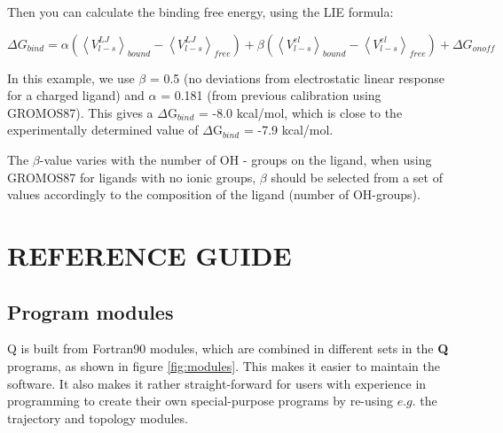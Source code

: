 \documentclass[a4paper,10pt]{article}
\begin{document}


Then you can calculate the binding free energy, using the LIE
formula:

\begin {equation}
\label{eq:LIE} \Delta G_{bind} = \alpha \left( {\left\langle
{V_{l-s}^{LJ}} \right\rangle_{bound} - \left\langle {V_{l-s}^{LJ}}
\right\rangle_{free}} \right) + \beta\left( {\left\langle
{V_{l-s}^{el}} \right\rangle_{bound} - \left\langle {V_{l-s}^{el}}
\right\rangle_{free}} \right) + \Delta G_{onoff}
\end{equation}

In this example, we use $\beta $ = 0.5 (no deviations from
electrostatic linear response for a charged ligand) and $\alpha $
= 0.181 (from previous calibration using GROMOS87). This gives a
$\Delta $G$_{bind}$ = -8.0 kcal/mol, which is close to the
experimentally determined value of $\Delta $G$_{bind}$ = -7.9
kcal/mol.

The $\beta $-value varies with the number of OH - groups on the
ligand, when using GROMOS87 for ligands with no ionic groups,
$\beta $ should be selected from a set of values accordingly to
the composition of the ligand (number of
OH-groups).\cite{Hansson:1998}


\section{REFERENCE GUIDE}
\subsection{Program modules}
Q is  built from  Fortran90 modules, which  are combined  in different
sets   in    the   \textbf{Q}    programs,   as   shown    in   figure
\ref{fig:modules}. This makes  it easier to maintain  the software. It
also makes  it rather  straight-forward for  users with  experience in
programming to  create their own special-purpose  programs by re-using
$e.g.$ the trajectory and topology modules.
\end{document}
